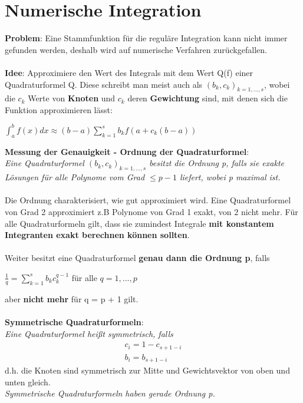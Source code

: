 \documentclass[10pt,a4paper]{article}
\begin{document}
	\section{Numerische Integration}
	\textbf{Problem}: Eine Stammfunktion für die reguläre Integration kann nicht immer gefunden werden, deshalb wird auf numerische Verfahren zurückgefallen.\\\\
	\textbf{Idee}: Approximiere den Wert des Integrals mit dem Wert Q(f) einer Quadraturformel Q. Diese schreibt man meist auch als $(b_k, c_k)_{k=1,...,s}$, wobei die $c_k$ Werte von \textbf{Knoten} und $c_k$ deren \textbf{Gewichtung} sind, mit denen sich die Funktion approximieren lässt:
	\begin{center}
		$\int_{a}^{b}f(x)dx \approx (b - a)\sum_{k=1}^{s}b_kf(a + c_k(b - a))$
	\end{center}
  \textbf{Messung der Genauigkeit - Ordnung der Quadraturformel}:\\
  \textit{Eine Quadraturformel $(b_k, c_k)_{k=1,...,s}$ besitzt die Ordnung p, falls sie exakte Lösungen für alle Polynome vom Grad $\leq p - 1$ liefert, wobei p maximal ist.}\\\\
  Die Ordnung charakterisiert, wie gut approximiert wird. Eine Quadraturformel von Grad 2 approximiert z.B Polynome von Grad 1 exakt, von 2 nicht mehr. Für alle Quadraturformeln gilt, dass sie zumindest Integrale \textbf{mit konstantem Integranten exakt berechnen können sollten}.\\\\
  Weiter besitzt eine Quadraturformel \textbf{genau dann die Ordnung p}, falls
  \begin{center}
  	$\frac{1}{q} = \sum_{k = 1}^{s}b_kc_k^{q-1}$ für alle $q = 1, ..., p$
  \end{center}
  aber \textbf{nicht mehr} für q = p + 1 gilt.\\\\
  \textbf{Symmetrische Quadraturformeln}:\\
  \textit{Eine Quadraturformel heißt symmetrisch, falls}
  \begin{align*}
    c_i = 1 - c_{s+1-i}\\
    b_i = b_{s+1-i}
  \end{align*}
  d.h. die Knoten sind symmetrisch zur Mitte und Gewichtsvektor von oben und unten gleich.\\
  \textit{Symmetrische Quadraturformeln haben gerade Ordnung p.}
  
\end{document}
